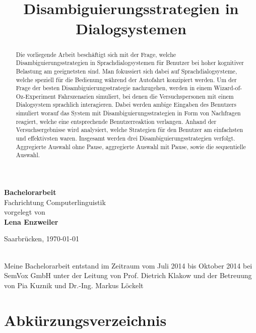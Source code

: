 \documentclass[12pt,a4paper]{scrartcl}
\title{$\,$\\  Disambiguierungsstrategien in Dialogsystemen}
\date{}
\author{}
\begin{document}

\maketitle
\sffamily
\begin{center}
\huge
\textbf{Bachelorarbeit}\\
\vfill
\LARGE
Fachrichtung Computerlinguistik\\
\vfill
\normalsize
vorgelegt von\\
\Large
\textbf{Lena Enzweiler}\\
\vfill


\normalsize
Saarbrücken,
\today

\end{center}

\thispagestyle{empty}
\rmfamily
\cleardoublepage
$\,$\\
\vfill
Meine Bachelorarbeit entstand im Zeitraum vom Juli 2014 bis Oktober 2014 bei SemVox GmbH unter der Leitung von Prof. Dietrich Klakow und der Betreuung von Pia Kuznik und Dr.-Ing. Markus Löckelt


\cleardoublepage

\tableofcontents
\cleardoublepage

\listoffigures
\cleardoublepage

\listoftables
\cleardoublepage
{}
\section*{Abkürzungsverzeichnis}  

\cleardoublepage


\renewcommand{\abstractname}{Abstract}
\subsection*{}  
\begin{abstract}
Die vorliegende Arbeit beschäftigt sich mit der Frage, welche Disambiguierungsstrategien in Sprachdialogsystemen für Benutzer bei hoher kognitiver Belastung am geeignetsten sind. Man fokussiert sich dabei auf Sprachdialogsysteme, welche speziell für die Bedienung während der Autofahrt konzipiert werden. Um der Frage der besten Disambiguierungsstrategie nachzugehen, werden in einem Wizard-of-Oz-Experiment Fahrszenarien simuliert, bei denen die Versuchspersonen mit einem Dialogsystem sprachlich interagieren. Dabei werden ambige Eingaben des Benutzers simuliert worauf das System mit Disambiguierungsstrategien in Form von Nachfragen reagiert, welche eine entsprechende Benutzerreaktion verlangen. Anhand der Versuchsergebnisse wird analysiert, welche Strategien für den Benutzer am einfachsten und effektivsten waren. Insgesamt werden drei Disambiguierungsstrategien verfolgt. Aggregierte Auswahl ohne Pause, aggregierte Auswahl mit Pause, sowie die sequentielle Auswahl. 
\end{abstract}
\newpage
\end{document}
